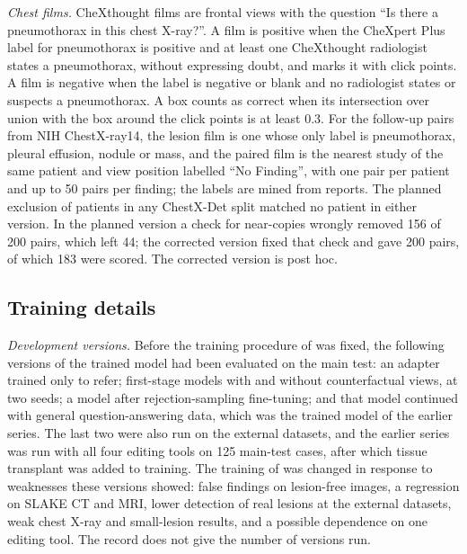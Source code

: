 \emph{Chest films.} CheXthought films are frontal views with the question ``Is there a pneumothorax in this chest X-ray?''. A film is positive when the CheXpert Plus label for pneumothorax is positive and at least one CheXthought radiologist states a pneumothorax, without expressing doubt, and marks it with click points. A film is negative when the label is negative or blank and no radiologist states or suspects a pneumothorax. A box counts as correct when its intersection over union with the box around the click points is at least 0.3. For the follow-up pairs from NIH ChestX-ray14, the lesion film is one whose only label is pneumothorax, pleural effusion, nodule or mass, and the paired film is the nearest study of the same patient and view position labelled ``No Finding'', with one pair per patient and up to 50 pairs per finding; the labels are mined from reports. The planned exclusion of patients in any ChestX-Det split matched no patient in either version. In the planned version a check for near-copies wrongly removed 156 of 200 pairs, which left 44; the corrected version fixed that check and gave 200 pairs, of which 183 were scored. The corrected version is post hoc.

\subsection{Training details}
\label{sec:s_training}

\emph{Development versions.} Before the training procedure of \ms{} was fixed, the following versions of the trained model had been evaluated on the main test: an adapter trained only to refer; first-stage models with and without counterfactual views, at two seeds; a model after rejection-sampling fine-tuning; and that model continued with general question-answering data, which was the trained model of the earlier series. The last two were also run on the external datasets, and the earlier series was run with all four editing tools on 125 main-test cases, after which tissue transplant was added to training. The training of \ms{} was changed in response to weaknesses these versions showed: false findings on lesion-free images, a regression on SLAKE CT and MRI, lower detection of real lesions at the external datasets, weak chest X-ray and small-lesion results, and a possible dependence on one editing tool. The record does not give the number of versions run.

